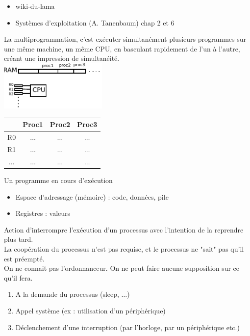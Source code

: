 	\begin{itemize}
		\item wiki-du-lama
		\item Systèmes d'exploitation (A. Tanenbaum) chap 2 et 6
	\end{itemize}

 La multiprogrammation, c'est exécuter simultanément plusieurs programmes sur une même machine, un même CPU, en basculant rapidement de l'un à l'autre, créant une impression de simultanéité. \\

\includegraphics[width=200px]{fig1.pdf}

\begin{tabular}{cccc}
	 & Proc1 & Proc2 & Proc3 \\ \hline
	R0 & $\ldots$ & $\ldots$ & $\ldots$ \\
	R1 & $\ldots$ & $\ldots$ & $\ldots$\\
	$\ldots$ & $\ldots$ & $\ldots$ & $\ldots$
\end{tabular}

 Un programme en cours d'exécution

\begin{itemize}
	\item Espace d'adressage (mémoire) : code, données, pile
	\item Registres : valeurs
\end{itemize}

 Action d'interrompre l'exécution d'un processus avec l'intention de la reprendre plus tard. \\
 La coopération du processus n'est pas requise, et le processus ne "sait" pas qu'il est préempté. \\

 On ne connait pas l'ordonnanceur. On ne peut faire aucune supposition sur ce qu'il fera. \\

\begin{enumerate}
	\item A la demande du processus (sleep, $\ldots$)
	\item Appel système (ex : utilisation d'un périphérique)
	\item Déclenchement d'une interruption (par l'horloge, par un périphérique etc.)
\end{enumerate}

